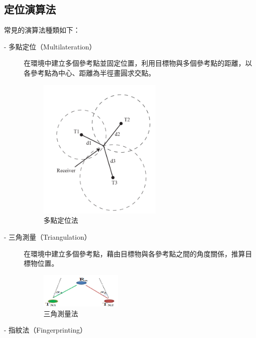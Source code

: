     \subsection{定位演算法}
    \label{chp:method-algorithm}
    常見的演算法種類如下：
    \begin{description}
        \item[- 多點定位（Multilateration）]\hfill 
        
        \qquad
        在環境中建立多個參考點並固定位置，利用目標物與多個參考點的距離，以各參考點為中心、距離為半徑畫圓求交點。
        \begin{figure}[ht]
            \centering
            \includegraphics[width=6cm]{ch2pic/multilateration.png}
            \caption{多點定位法\cite{survey_light2020}}
            \label{pic:multilateration}
        \end{figure}
    
        \item[- 三角測量（Triangulation）] \hfill 
        
        \qquad
        在環境中建立多個參考點，藉由目標物與各參考點之間的角度關係，推算目標物位置。
        \begin{figure}[ht]
            \centering
            \includegraphics[width=4cm]{ch2pic/triangulation.png}
            \caption{三角測量法\cite{pic:triangulation}}
            \label{pic:triangulation}
        \end{figure}
        
        \item[- 指紋法（Fingerprinting）] \hfill 
        

\end{description}
